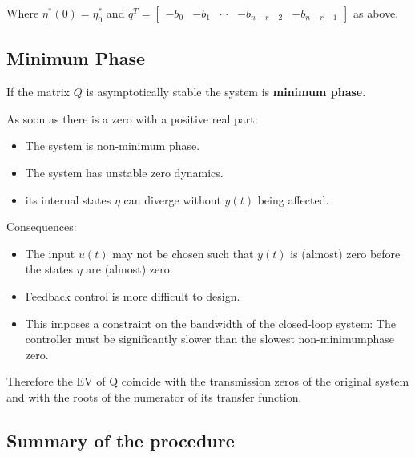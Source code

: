\documentclass[10pt,a4paper]{scrartcl}
\begin{document}
\begin{multicols*}{3}
Where $\eta^\ast(0)=\eta_0^\ast$ and $q^T=\begin{bmatrix}-b_0&-b_1&\cdots&-b_{n-r-2}&-b_{n-r-1}\end{bmatrix}$ as above.

\vfill
\null
\newpage

\subsection{Minimum Phase}

If the matrix $Q$ is asymptotically stable the system is \textbf{minimum phase}.

As soon as there is a zero with a positive real part:

\begin{itemize}
\ncompaq
\item The system is non-minimum phase.
\item The system has unstable zero dynamics.
\item its internal states $\eta$ can diverge without $y(t)$ being affected.
\end{itemize}

Consequences:

\begin{itemize}
\ncompaq
\item The input $u(t)$ may not be chosen such that $y(t)$ is (almost) zero before the states $\eta$ are (almost) zero.
\item Feedback control is more difficult to design.
\item This imposes a constraint on the bandwidth of the closed-loop system: The controller must be significantly slower than the slowest non-minimumphase zero.
\end{itemize}


Therefore the EV of Q coincide with the transmission zeros of the original system and with the roots of the numerator of its transfer function.


\subsection{Summary of the procedure}


\end{multicols*}
\end{document}
